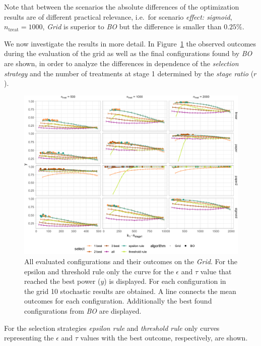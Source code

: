 \documentclass[bimj,fleqn]{w-art}
\theoremstyle{plain}
\theoremstyle{definition}
\begin{document}
Note that between the scenarios the absolute differences of the optimization results are of different practical relevance,
i.e.\ for scenario \emph{effect: sigmoid}, $n_{\text{treat}} = 1000$, \emph{Grid} is superior to \emph{BO} but the difference is smaller than $0.25\%$.

We now investigate the results in more detail.
In Figure~\ref{fig:plot_allbest} the observed outcomes during the evaluation of the grid as well as the final configurations found by \emph{BO} are shown, in order to analyze the differences in dependence of the \emph{selection strategy} and the number of treatments at stage 1 determined by the \emph{stage ratio} ($r$).
\begin{figure}[htb]
\centering
\includegraphics[width=\linewidth]{generated/figures/plot_allbest.pdf}
\caption{%
  All evaluated configurations and their outcomes on the \emph{Grid}.
  For the epsilon and threshold rule only the curve for the $\epsilon$ and $\tau$ value that reached the best power ($y$) is displayed.
  For each configuration in the grid 10 stochastic results are obtained.
  A line connects the mean outcomes for each configuration.
  Additionally the best found configurations from \emph{BO} are displayed.
  }
\label{fig:plot_allbest}
\end{figure}
For the selection strategies \emph{epsilon rule} and \emph{threshold rule} only curves representing the $\epsilon$ and $\tau$ values with the best outcome, respectively, are shown.
\end{document}
